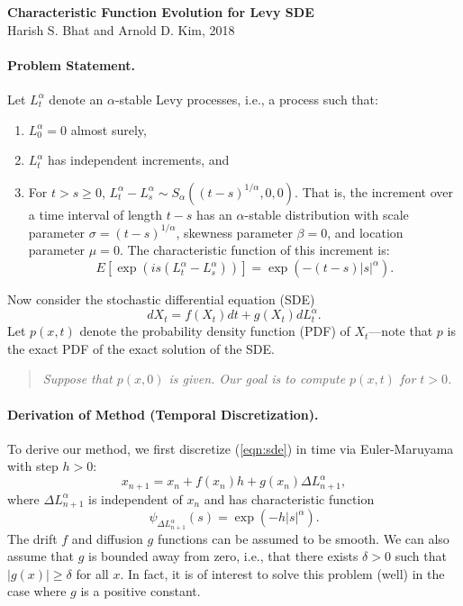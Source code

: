 \documentclass[11pt,letterpaper]{article}
\begin{document}
\begin{center}
\textbf{Characteristic Function Evolution for Levy SDE}\\
Harish S. Bhat and Arnold D. Kim, 2018
\end{center}

\paragraph{Problem Statement.} Let $L_t^{\alpha}$ denote an $\alpha$-stable Levy processes, i.e., a process such that:
\begin{enumerate}
\item $L_0^\alpha = 0$ almost surely,
\item $L_t^\alpha$ has independent increments, and
\item For $t > s \geq 0$, $L_t^\alpha - L_s^\alpha \sim S_\alpha((t-s)^{1/\alpha},0,0)$.  That is, the increment over a time interval of length $t-s$ has an $\alpha$-stable distribution with scale parameter $\sigma = (t-s)^{1/\alpha}$, skewness parameter $\beta=0$, and location parameter $\mu=0$.  The characteristic function of this increment is:
\begin{equation}
\label{eqn:cfinc}
E[\exp(i s (L_t^\alpha - L_s^\alpha))] = \exp(-(t-s) |s|^\alpha).
\end{equation}
\end{enumerate}

\noindent Now consider the stochastic differential equation (SDE)
\begin{equation}
\label{eqn:sde}
dX_t = f(X_t) dt + g(X_t) dL_t^{\alpha}.
\end{equation}
Let $p(x,t)$ denote the probability density function (PDF) of $X_t$---note that $p$ is the exact PDF of the exact solution of the SDE.

\begin{quote}
\emph{Suppose that $p(x,0)$ is given.  Our goal is to compute $p(x,t)$ for $t > 0$.}
\end{quote}

\paragraph{Derivation of Method (Temporal Discretization).} To derive our method, we first discretize (\ref{eqn:sde}) in time via Euler-Maruyama with step $h > 0$:
\begin{equation}
\label{eqn:em}
x_{n+1} = x_n + f(x_{n}) h + g(x_{n}) \Delta L_{n+1}^{\alpha},
\end{equation}
where $\Delta L_{n+1}^{\alpha}$ is independent of $x_n$ and has characteristic function
\begin{equation}
\label{eqn:emchar}
\psi_{\Delta L^{\alpha}_{n+1}}(s) = \exp(- h |s|^\alpha).
\end{equation}
The drift $f$ and diffusion $g$ functions can be assumed to be smooth.  We can also assume that $g$ is bounded away from zero, i.e., that there exists $\delta > 0$ such that $|g(x)| \geq \delta$ for all $x$.  In fact, it is of interest to solve this problem (well) in the case where $g$ is a positive constant.
\end{document}
